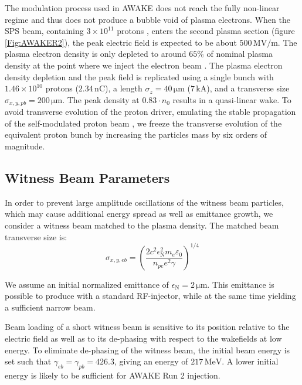 \documentclass[aps,prstab,reprint,amsmath,amssymb,groupedaddress]{revtex4-1}
\newcommand{\unit}[1]{\,\mathrm{#1}}
\newcommand{\funit}[2]{\,\mathrm{#1}/\mathrm{#2}}
\newcommand{\nexp}[1]{\times 10^{#1}}
\begin{document}
The modulation process used in AWAKE does not reach the fully non-linear regime and thus does not produce a bubble void
of plasma electrons. When the SPS beam, containing $3\nexp{11}$ protons \cite{gschwendtner:2016}, enters the second
plasma section (figure \ref{Fig:AWAKER2}), the peak electric field is expected to be about $500\funit{MV}{m}$. The
plasma electron density is only depleted to around $65\%$ of nominal plasma density at the point where we inject the
electron beam \cite{awake_collaboration:2016}. The plasma electron density depletion and the peak field is replicated
using a single bunch with $1.46\nexp{10}$ protons ($2.34\unit{nC}$), a length $\sigma_{z} = 40\unit{\mu m}$
($7\unit{kA}$), and a transverse size $\sigma_{x,y,pb} = 200\unit{\mu m}$. The peak density at $0.83\cdot n_{0}$ results
in a quasi-linear wake. To avoid transverse evolution of the proton driver, emulating the stable propagation of the
self-modulated proton beam \cite{lotov:2011, lotov:2015, caldwell:2011}, we freeze the transverse evolution of the
equivalent proton bunch by increasing the particles mass by six orders of magnitude.

\subsection{Witness Beam Parameters}\label{S:M:Setup}

In order to prevent large amplitude oscillations of the witness beam particles, which may cause additional energy spread
as well as emittance growth, we consider a witness beam matched to the plasma density. The matched beam transverse size
is:
\begin{equation}
    \sigma_{x,y,eb}=\left(\frac{2c^{2}\epsilon_{\mathrm{N}}^{2}m_{e}\varepsilon_{0}}{n_{pe}e^{2}\gamma}\right)^{1/4}
    \label{EQ:Matched}
\end{equation}

We assume an initial normalized emittance of $\epsilon_{\mathrm{N}} = 2\unit{\mu m}$. This emittance is possible to
produce with a standard RF-injector, while at the same time yielding a sufficient narrow beam.

Beam loading of a short witness beam is sensitive to its position relative to the electric field \cite{tzoufras:2009}
as well as to its de-phasing with respect to the wakefields at low energy. To eliminate de-phasing of the witness beam,
the initial beam energy is set such that $\gamma_{eb} = \gamma_{pb} = 426.3$, giving an energy of $217\unit{MeV}$. A
lower initial energy is likely to be sufficient for AWAKE Run 2 injection.
\end{document}
